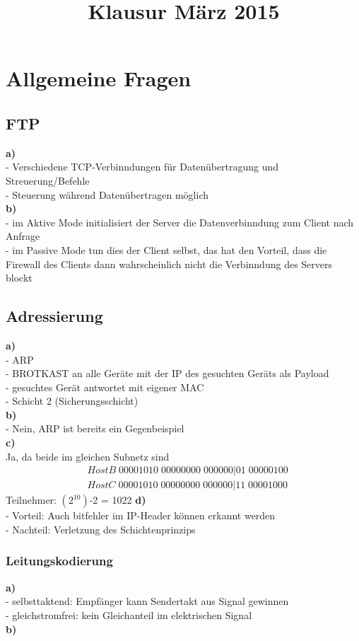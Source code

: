 \documentclass{article}
\title{Klausur M\"arz 2015}
\begin{document}
	\maketitle
	\section{Allgemeine Fragen}
		\subsection{FTP}
			\textbf{a)}\\
				- Verschiedene TCP-Verbinndungen f\"ur Daten\"ubertragung und Streuerung/Befehle\\
				- Steuerung w\"ahrend Daten\"ubertragen m\"oglich\\
			\textbf{b)}\\
				- im Aktive Mode initialisiert der Server die Datenverbinndung zum Client nach Anfrage\\
				- im Passive Mode tun dies der Client selbst, das hat den Vorteil, dass die Firewall des Clients dann wahrscheinlich nicht die Verbinndung des Servers blockt\\
		\subsection{Adressierung}
			\textbf{a)}\\
				- ARP \\
				- BROTKAST an alle Ger\"ate mit der IP des gesuchten Ger\"ats als Payload\\
				- gesuchtes Ger\"at antwortet mit eigener MAC\\
				- Schicht 2 (Sicherungsschicht)\\
			\textbf{b)}\\
				- Nein, ARP ist bereits ein Gegenbeispiel\\
			\textbf{c)}\\
				Ja, da beide im gleichen Subnetz sind
				\begin{align*}
					&HostB\;00001010\;00000000\;000000|01\;00000100 \\
					&HostC\;00001010\;00000000\;000000|11\;00001000
				\end{align*}
				Teilnehmer: $(2^10)$-2 = 1022
			\textbf{d)}\\
				- Vorteil: Auch bitfehler im IP-Header k\"onnen erkannt werden\\
				- Nachteil: Verletzung des Schichtenprinzips
		\subsubsection{Leitungskodierung}
			\textbf{a)}\\
				- selbsttaktend: Empfänger kann Sendertakt aus Signal gewinnen \\
				- gleichstromfrei: kein Gleichanteil im elektrischen Signal \\
			\textbf{b)}\\
				
				
\end{document}
